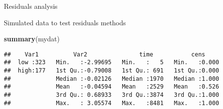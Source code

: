 \documentclass[
  ignorenonframetext,
]{beamer}
\newenvironment{Shaded}{\begin{snugshade}}{\end{snugshade}}
\newcommand{\DataTypeTok}[1]{\textcolor[rgb]{0.13,0.29,0.53}{#1}}
\newcommand{\DecValTok}[1]{\textcolor[rgb]{0.00,0.00,0.81}{#1}}
\newcommand{\FloatTok}[1]{\textcolor[rgb]{0.00,0.00,0.81}{#1}}
\newcommand{\KeywordTok}[1]{\textcolor[rgb]{0.13,0.29,0.53}{\textbf{#1}}}
\newcommand{\NormalTok}[1]{#1}
\newcommand{\OperatorTok}[1]{\textcolor[rgb]{0.81,0.36,0.00}{\textbf{#1}}}
\newcommand{\StringTok}[1]{\textcolor[rgb]{0.31,0.60,0.02}{#1}}
\begin{document}
\begin{frame}[fragile]{Residuals analysis}
\begin{Shaded}
\end{Shaded}

\end{frame}

\begin{frame}[fragile]{Simulated data to test residuals methods}
\protect\hypertarget{simulated-data-to-test-residuals-methods}{}

\footnotesize

\begin{Shaded}
\begin{Highlighting}[]
\KeywordTok{summary}\NormalTok{(mydat)}
\end{Highlighting}
\end{Shaded}

\begin{verbatim}
##    Var1          Var2               time           cens      
##  low :323   Min.   :-2.99695   Min.   :   5   Min.   :0.000  
##  high:177   1st Qu.:-0.79008   1st Qu.: 691   1st Qu.:0.000  
##             Median :-0.02126   Median :1970   Median :1.000  
##             Mean   :-0.04594   Mean   :2529   Mean   :0.526  
##             3rd Qu.: 0.68933   3rd Qu.:3874   3rd Qu.:1.000  
##             Max.   : 3.05574   Max.   :8481   Max.   :1.000
\end{verbatim}

\end{frame}
\end{document}
